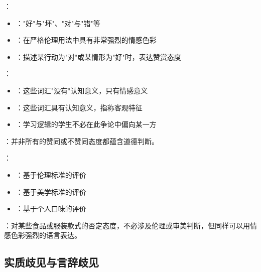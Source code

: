 \begin{theorembox}[title=伦理语词的双重性质]
：
\begin{itemize}
  \item {}："好"与"坏"、"对"与"错"等
  \item {}：在严格伦理用法中具有非常强烈的情感色彩
  \item {}：描述某行动为"对"或某情形为"好"时，表达赞赏态度
\end{itemize}

：
\begin{itemize}
  \item {}：这些词汇"没有"认知意义，只有情感意义
  \item {}：这些词汇具有认知意义，指称客观特征
  \item {}：学习逻辑的学生不必在此争论中偏向某一方
\end{itemize}
\end{theorembox}

\begin{theorembox}[title=态度表达的多样性]
：并非所有的赞同或不赞同态度都蕴含道德判断。

：
\begin{itemize}
  \item {}：基于伦理标准的评价
  \item {}：基于美学标准的评价
  \item {}：基于个人口味的评价
\end{itemize}

：对某些食品或服装款式的否定态度，不必涉及伦理或审美判断，但同样可以用情感色彩强烈的语言表达。
\end{theorembox}

\subsection{实质歧见与言辞歧见}

